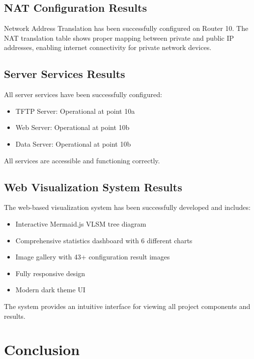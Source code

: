 \documentclass[12pt,a4paper]{report}
\begin{document}
\section{NAT Configuration Results}

Network Address Translation has been successfully configured on Router 10. The NAT translation table shows proper mapping between private and public IP addresses, enabling internet connectivity for private network devices.

\section{Server Services Results}

All server services have been successfully configured:
\begin{itemize}
    \item TFTP Server: Operational at point 10a
    \item Web Server: Operational at point 10b
    \item Data Server: Operational at point 10b
\end{itemize}

All services are accessible and functioning correctly.

\section{Web Visualization System Results}

The web-based visualization system has been successfully developed and includes:
\begin{itemize}
    \item Interactive Mermaid.js VLSM tree diagram
    \item Comprehensive statistics dashboard with 6 different charts
    \item Image gallery with 43+ configuration result images
    \item Fully responsive design
    \item Modern dark theme UI
\end{itemize}

The system provides an intuitive interface for viewing all project components and results.

\newpage

\chapter{Conclusion}
\end{document}
